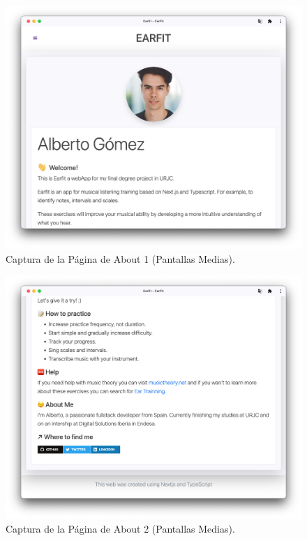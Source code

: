 \documentclass[12pt,twoside,titlepage]{report}
\begin{document}
\begin{figure}[H]
    \centering
    \includegraphics[scale=0.3]{Capturas Earfit/Tablet/About1}
    \caption{Captura de la Página de About 1 (Pantallas Medias).}
    \label{fig:TabletAbout1}
\end{figure}

\begin{figure}[H]
    \centering
    \includegraphics[scale=0.3]{Capturas Earfit/Tablet/About2}
    \caption{Captura de la Página de About 2 (Pantallas Medias).}
    \label{fig:TabletAbout2}
\end{figure}
\end{document}
